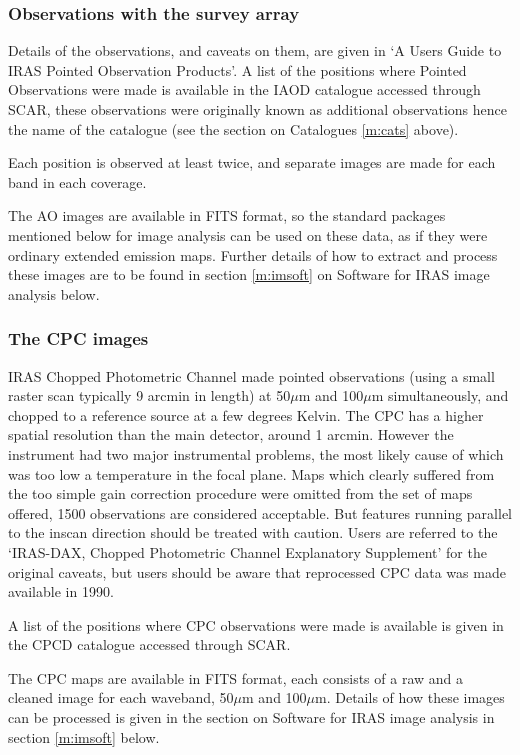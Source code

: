 \subsubsection{Observations with the survey array}
Details of the observations, and caveats on them, are given in `A Users Guide to
IRAS Pointed Observation Products'.
A list of the positions where Pointed Observations were made is available
in the IAOD catalogue accessed through SCAR, these observations were originally
known as additional observations hence the name of the catalogue (see the
section on Catalogues \ref{m:cats} above).

Each position is observed at least twice, and separate images are made for each
band in each coverage.

The AO images are available in FITS format, so the standard packages mentioned
below for image analysis can be used on these data, as if they were ordinary 
extended emission maps. Further details of how to extract and process these
images are to be found in section \ref{m:imsoft} on Software for IRAS image
analysis below.

\subsubsection{The CPC images}
IRAS Chopped Photometric Channel made pointed observations (using a small
raster scan typically 9 arcmin in length) at 50$\mu$m and 100$\mu$m 
simultaneously, and chopped to a reference source at a few degrees Kelvin. The 
CPC has a higher spatial resolution than the main detector, around 1 arcmin. 
However
the instrument had two major instrumental problems, the most likely cause of
which was too low a temperature in the focal plane. Maps which clearly suffered
from the too simple gain correction procedure were omitted from the set of
maps offered, 1500 observations are considered acceptable. But features running
parallel to the inscan direction should be treated with caution. Users are
referred to the `IRAS-DAX, Chopped Photometric Channel Explanatory Supplement'
for the original caveats, but users should be aware that reprocessed CPC data
was made available in 1990.

A list of the positions where CPC observations were made is available is given
in the CPCD catalogue accessed through SCAR.

The CPC maps are available in FITS format, each consists of a raw and a cleaned
image for each waveband, 50$\mu$m and 100$\mu$m. Details of how these images can
be processed is given in the section on Software for IRAS image analysis in
section \ref{m:imsoft} below.

